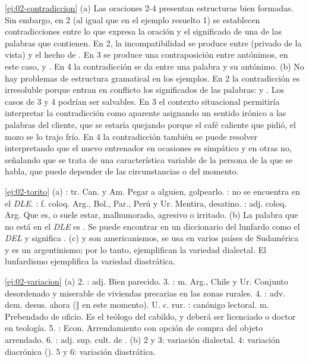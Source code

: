 \begin{solucion}{\ref{ej:02-contradiccion}}
(a) Las oraciones 2-4 presentan estructuras bien formadas. Sin embargo, en 2 (al
igual que en el ejemplo resuelto 1) se establecen contradicciones entre lo que
expresa la oración y el significado de una de las palabras que contienen. En 2,
la incompatibilidad se produce entre  (privado de la vista) y el
hecho de . En 3 se produce una contraposición entre
antónimos, en este caso,  y . En 4 la
contradicción se da entre una palabra y su antónimo. (b) No hay problemas de
estructura gramatical en los ejemplos. En 2 la contradicción es irresoluble
porque entran en conflicto los significados de las palabras:  y
. Los casos de 3 y 4 podrían ser salvables. En 3 el contexto
situacional permitiría interpretar la contradicción como aparente asignando un
sentido irónico a las palabras del cliente, que se estaría quejando porque el
café caliente que pidió, el mozo se lo trajo frío. En 4 la contradicción
también se puede resolver interpretando que el nuevo entrenador en ocasiones es
simpático y en otras no, señalando que se trata de una característica variable
de la persona de la que se habla, que puede depender de las circunstancias o del
momento.
\end{solucion}

\begin{solucion}{\ref{ej:02-torito}}
(a) : tr. Can. y Am. Pegar a alguien, golpearlo. : no
se encuentra en el \textit{DLE}. : f. coloq. Arg., Bol., Par.,
Perú y Ur. Mentira, desatino. : adj. coloq. Arg. Que es, o suele
estar, malhumorado, agresivo o irritado. (b) La palabra que no está en el
\textit{DLE} es . Se puede encontrar en un diccionario del lunfardo
como el \textit{DEL} \parencite{conde2004} y significa . (c)
 y  son americanismos,  se usa en varios
países de Sudamérica y  es un argentinismo; por lo tanto,
ejemplifican la variedad dialectal. El lunfardismo  ejemplifica la
variedad diastrática.
\end{solucion}

\begin{solucion}{\ref{ej:02-variacion}}
(a) 2. : adj. Bien parecido. 3. : m. Arg., Chile
y Ur. Conjunto desordenado y miserable de viviendas precarias en las zonas
rurales. 4. : adv. dem. desus. ahora (‖ en este momento). U. c.
rur. : canónigo lectoral. m. Prebendado de oficio. Es el
teólogo del cabildo, y deberá ser licenciado o doctor en teología. 5.
: Econ. Arrendamiento con opción de compra del objeto arrendado.
6. : adj. sup. cult. de . (b) 2 y 3: variación
dialectal. 4: variación diacrónica (). 5 y 6: variación
diastrática.
\end{solucion}

